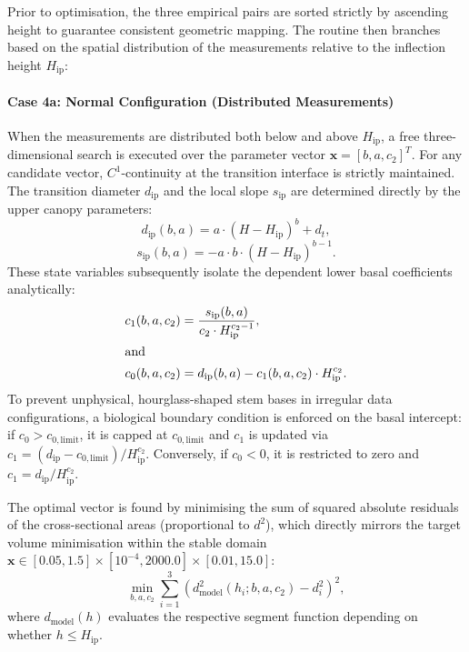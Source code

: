\documentclass[twocolumn, bibliography=totoc]{scrartcl}
\begin{document}
Prior to optimisation, the three empirical pairs are sorted strictly by ascending height to guarantee consistent geometric mapping. The routine then branches based on the spatial distribution of the measurements relative to the inflection height $H_{\text{ip}}$:

\paragraph{Case 4a: Normal Configuration (Distributed Measurements)}
When the measurements are distributed both below and above $H_{\text{ip}}$, a free three-dimensional search is executed over the parameter vector $\mathbf{x} = [b, a, c_2]^T$. For any candidate vector, $C^1$-continuity at the transition interface is strictly maintained. The transition diameter $d_{\text{ip}}$ and the local slope $s_{\text{ip}}$ are determined directly by the upper canopy parameters:
\begin{equation}
    d_{\text{ip}}(b, a) = a \cdot (H - H_{\text{ip}})^b + d_t,
\end{equation}
\begin{equation}
    s_{\text{ip}}(b, a) = -a \cdot b \cdot (H - H_{\text{ip}})^{b-1}.
\end{equation}
These state variables subsequently isolate the dependent lower basal coefficients analytically:
\begin{subequations}
\begin{align}
    c_1(b, a, c_2) &= \frac{s_{\text{ip}}(b, a)}{c_2 \cdot H_{\text{ip}}^{c_2-1}}, \\
    \intertext{and}
    c_0(b, a, c_2) &= d_{\text{ip}}(b, a) - c_1(b, a, c_2) \cdot H_{\text{ip}}^{c_2}.
\end{align}
\end{subequations}
To prevent unphysical, hourglass-shaped stem bases in irregular data configurations, a biological boundary condition is enforced on the basal intercept: if $c_0 > c_{0,\text{limit}}$, it is capped at $c_{0,\text{limit}}$ and $c_1$ is updated via $c_1 = (d_{\text{ip}} - c_{0,\text{limit}}) / H_{\text{ip}}^{c_2}$. Conversely, if $c_0 < 0$, it is restricted to zero and $c_1 = d_{\text{ip}} / H_{\text{ip}}^{c_2}$. 

The optimal vector is found by minimising the sum of squared absolute residuals of the cross-sectional areas (proportional to $d^2$), which directly mirrors the target volume minimisation within the stable domain $\mathbf{x} \in [0.05, 1.5] \times [10^{-4}, 2000.0] \times [0.01, 15.0]$:
\begin{equation}
    \min_{b, a, c_2} \sum_{i=1}^{3} \left( d_{\text{model}}^2(h_i; b, a, c_2) - d_i^2 \right)^2,
\end{equation}
where $d_{\text{model}}(h)$ evaluates the respective segment function depending on whether $h \le H_{\text{ip}}$.
\end{document}
